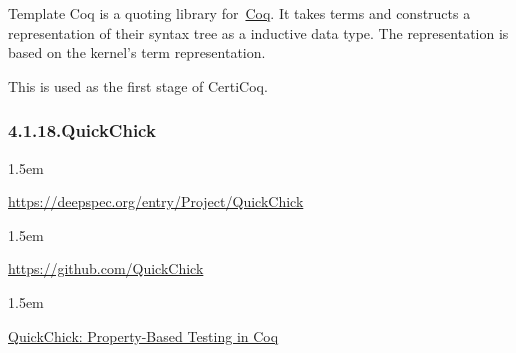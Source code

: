 \documentclass[12pt,twoside]{article}
\begin{document}
\noindent{}Template Coq is a quoting library for~\href{http://coq.inria.fr}{Coq}. It
takes  terms and constructs a representation of their syntax tree as
a  inductive data type. The representation is based on the kernel's
term representation.%

This is used as the first stage of CertiCoq.%

\subsubsection{4.1.18.\hspace*{0.5em}QuickChick}\label{sec-quickchick}%

\begin{mddefinitions}%


\begin{mdbmarginx}{}{}{}{1.5em}%
\begin{mddefdata}%
\href{https://deepspec.org/entry/Project/QuickChick}{{\ttfamily https://\hspace{0pt}deepspec.\hspace{0pt}org/\hspace{0pt}entry/\hspace{0pt}Project/\hspace{0pt}QuickChick}}
\end{mddefdata}%
\end{mdbmarginx}%


\begin{mdbmarginx}{}{}{}{1.5em}%
\begin{mddefdata}%
\href{https://github.com/QuickChick}{{\ttfamily https://\hspace{0pt}github.\hspace{0pt}com/\hspace{0pt}QuickChick}}
\end{mddefdata}%
\end{mdbmarginx}%


\begin{mdbmarginx}{}{}{}{1.5em}%
\begin{mddefdata}%
\href{https://softwarefoundations.cis.upenn.edu/qc-current}{QuickChick: Property-Based Testing in Coq}%
\end{mddefdata}%
\end{mdbmarginx}%
\end{mddefinitions}%
\end{document}
